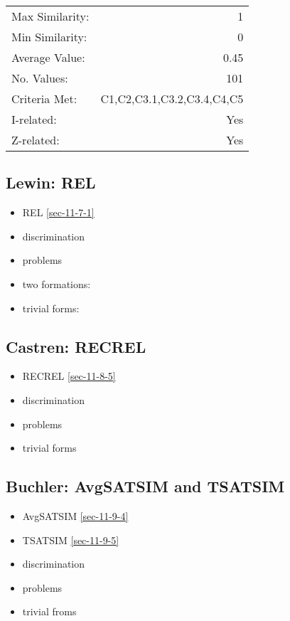 \documentclass{article}
\begin{document}
\begin{center}
\begin{tabular}{lr}
 Max Similarity:  &                           1  \\
 Min Similarity:  &                           0  \\
 Average Value:   &                        0.45  \\
 No. Values:      &                         101  \\
 Criteria Met:    &  C1,C2,C3.1,C3.2,C3.4,C4,C5  \\
 I-related:       &                         Yes  \\
 Z-related:       &                         Yes  \\
\end{tabular}
\end{center}
\subsection{Lewin: REL}
\label{sec-7-2}

\begin{itemize}
\item REL \ref{sec-11-7-1}
\item discrimination
\item problems
\item two formations:
\item trivial forms:
\end{itemize}
\subsection{Castren: RECREL}
\label{sec-7-3}

\begin{itemize}
\item RECREL \ref{sec-11-8-5}
\item discrimination
\item problems
\item trivial forms
\end{itemize}
\subsection{Buchler: AvgSATSIM and TSATSIM}
\label{sec-7-4}

\begin{itemize}
\item AvgSATSIM \ref{sec-11-9-4}
\item TSATSIM \ref{sec-11-9-5}
\item discrimination
\item problems
\item trivial froms
\end{itemize}
\end{document}

